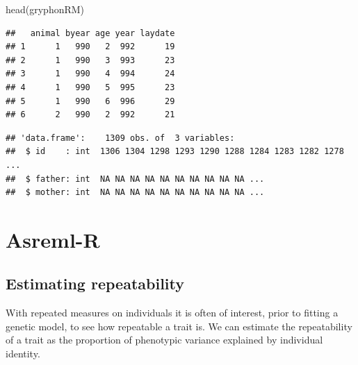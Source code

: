 \documentclass[
  12pt,
]{book}
\newenvironment{Shaded}{\begin{snugshade}}{\end{snugshade}}
\newcommand{\FunctionTok}[1]{\textcolor[rgb]{0.00,0.00,0.00}{#1}}
\newcommand{\NormalTok}[1]{#1}
\newcommand{\OtherTok}[1]{\textcolor[rgb]{0.56,0.35,0.01}{#1}}
\newcommand{\SpecialCharTok}[1]{\textcolor[rgb]{0.00,0.00,0.00}{#1}}
\begin{document}
\begin{Shaded}
\begin{Highlighting}[]
\FunctionTok{head}\NormalTok{(gryphonRM)}
\end{Highlighting}
\end{Shaded}

\begin{verbatim}
##   animal byear age year laydate
## 1      1   990   2  992      19
## 2      1   990   3  993      23
## 3      1   990   4  994      24
## 4      1   990   5  995      23
## 5      1   990   6  996      29
## 6      2   990   2  992      21
\end{verbatim}

\begin{verbatim}
## 'data.frame':    1309 obs. of  3 variables:
##  $ id    : int  1306 1304 1298 1293 1290 1288 1284 1283 1282 1278 ...
##  $ father: int  NA NA NA NA NA NA NA NA NA NA ...
##  $ mother: int  NA NA NA NA NA NA NA NA NA NA ...
\end{verbatim}

\begin{Shaded}
\end{Shaded}

\hypertarget{asreml-r-2}{%
\section{Asreml-R}\label{asreml-r-2}}

\hypertarget{estimating-repeatability}{%
\subsection{Estimating repeatability}\label{estimating-repeatability}}

With repeated measures on individuals it is often of interest, prior to fitting a genetic model, to see how repeatable a trait is. We can estimate the repeatability of a trait as the proportion of phenotypic variance explained by individual identity.
\end{document}
